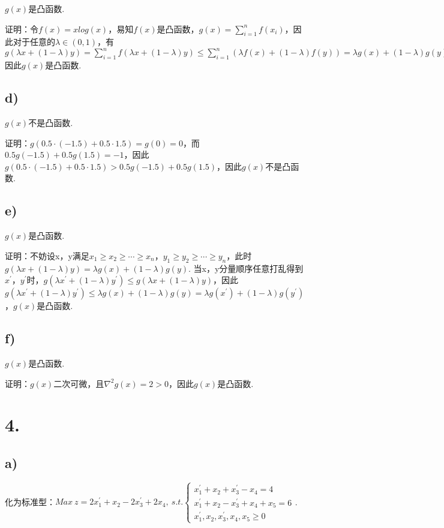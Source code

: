 \documentclass{article}
\begin{document}
	$g(x)$是凸函数.

	证明：令$f(x)=xlog(x)$，易知$f(x)$是凸函数，$g(x)=\sum^n_{i=1}f(x_i)$，因此对于任意的$\lambda \in (0,1)$，有$g(\lambda x+(1-\lambda)y)=\sum^n_{i=1}f(\lambda x+(1-\lambda)y)\leq\sum^n_{i=1}(\lambda f(x)+(1-\lambda)f(y))=\lambda g(x)+(1-\lambda)g(y)$因此$g(x)$是凸函数.
	
	\subsection*{d)}
	
	$g(x)$不是凸函数.
	
	证明：$g(0.5\cdot (-1.5)+0.5\cdot 1.5)=g(0)=0$，而$0.5g(-1.5)+0.5g(1.5)=-1$，因此$g(0.5\cdot (-1.5)+0.5\cdot 1.5)>0.5g(-1.5)+0.5g(1.5)$，因此$g(x)$不是凸函数.

	\subsection*{e)}
	
	$g(x)$是凸函数.
	
	证明：不妨设x，y满足$x_1 \geq x_2 \geq \cdots \geq x_n$，$y_1 \geq y_2 \geq \cdots \geq y_n$，此时$g(\lambda x+(1-\lambda)y)=\lambda g(x)+(1-\lambda)g(y)$. 当x，y分量顺序任意打乱得到$x^\prime ，y^\prime$时，$g(\lambda x^\prime+(1-\lambda)y^\prime)\leq g(\lambda x+(1-\lambda)y)$，因此$g(\lambda x^\prime+(1-\lambda)y^\prime)\leq \lambda g(x)+(1-\lambda)g(y)=\lambda g(x^\prime)+(1-\lambda)g(y^\prime)$，$g(x)$是凸函数.
	
	\subsection*{f)}
	
	$g(x)$是凸函数.
	
	证明：$g(x)$二次可微，且$\nabla^2g(x)=2>0$，因此$g(x)$是凸函数.
	
	
	\section*{4.}
	
	\subsection*{a)}
	
	化为标准型：$Max\ z=2x_1^\prime+x_2-2x_3^\prime+2x_4,\ s.t. \begin{cases}
		x_1^\prime+x_2+x_3^\prime-x_4=4 \\
		x_1^\prime+x_2-x_3^\prime+x_4+x_5=6\\
		x_1^\prime, x_2, x_3^\prime, x_4, x_5 \geq 0
	\end{cases}$.
	
\end{document}
